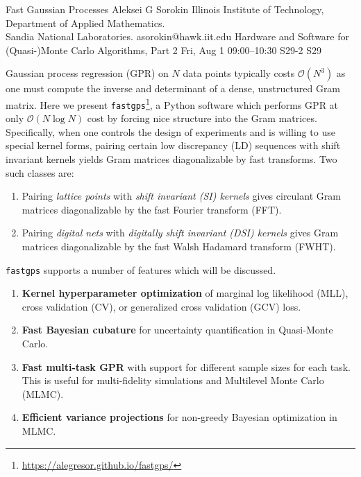 \begin{talk}
  {Fast Gaussian Processes}%
  {Aleksei G Sorokin}%
  {Illinois Institute of Technology, Department of Applied Mathematics. \\ Sandia National Laboratories.}%
  {asorokin@hawk.iit.edu}%
  {}%
  {Hardware and Software for (Quasi-)Monte Carlo Algorithms, Part 2}%
  {Fri, Aug 1 09:00–10:30}%
  {S29-2}%
  {S29}%
				

        Gaussian process regression (GPR) on $N$ data points typically costs $\mathcal{O}(N^3)$ as one must compute the inverse and determinant of a dense, unstructured Gram matrix. Here we present \texttt{fastgps}\footnote{\url{https://alegresor.github.io/fastgps/}}, a Python software which performs GPR at only $\mathcal{O}(N \log N)$ cost by forcing nice structure into the Gram matrices. Specifically, when one controls the design of experiments and is willing to use special kernel forms, pairing certain low discrepancy (LD) sequences with shift invariant kernels yields Gram matrices diagonalizable by fast transforms. Two such classes are:
        \begin{enumerate}
          \item Pairing \emph{lattice points} with \emph{shift invariant (SI) kernels} gives circulant Gram matrices diagonalizable by the fast Fourier transform (FFT). 
          \item Pairing \emph{digital nets} with \emph{digitally shift invariant (DSI) kernels} gives Gram matrices diagonalizable by the fast Walsh Hadamard transform (FWHT). 
        \end{enumerate}
        \texttt{fastgps} supports a number of features which will be discussed. 
        \begin{enumerate}
          \item \textbf{Kernel hyperparameter optimization} of marginal log likelihood (MLL), cross validation (CV), or generalized cross validation (GCV) loss.
          \item \textbf{Fast Bayesian cubature} for uncertainty quantification in Quasi-Monte Carlo. 
          \item \textbf{Fast multi-task GPR} with support for different sample sizes for each task. This is useful for multi-fidelity simulations and Multilevel Monte Carlo (MLMC). 
          \item \textbf{Efficient variance projections} for non-greedy Bayesian optimization in MLMC.

\end{enumerate}
\end{talk}
